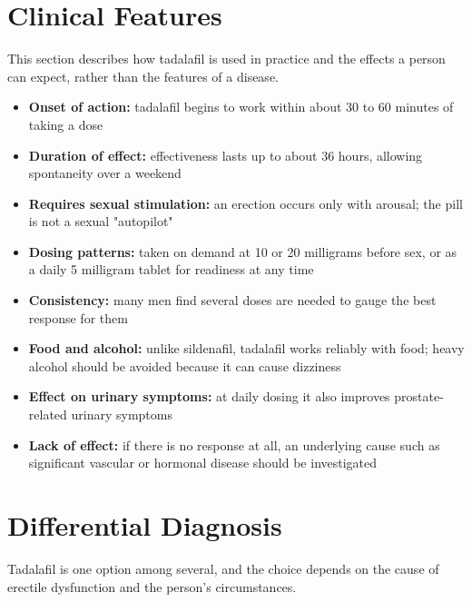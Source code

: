 \section*{Clinical Features}
This section describes how tadalafil is used in practice and the effects a person can expect, rather than the features of a disease.

\begin{itemize}
    \item \textbf{Onset of action:} tadalafil begins to work within about 30 to 60 minutes of taking a dose
    \item \textbf{Duration of effect:} effectiveness lasts up to about 36 hours, allowing spontaneity over a weekend
    \item \textbf{Requires sexual stimulation:} an erection occurs only with arousal; the pill is not a sexual "autopilot"
    \item \textbf{Dosing patterns:} taken on demand at 10 or 20 milligrams before sex, or as a daily 5 milligram tablet for readiness at any time
    \item \textbf{Consistency:} many men find several doses are needed to gauge the best response for them
    \item \textbf{Food and alcohol:} unlike sildenafil, tadalafil works reliably with food; heavy alcohol should be avoided because it can cause dizziness
    \item \textbf{Effect on urinary symptoms:} at daily dosing it also improves prostate-related urinary symptoms
    \item \textbf{Lack of effect:} if there is no response at all, an underlying cause such as significant vascular or hormonal disease should be investigated
\end{itemize}

\section*{Differential Diagnosis}
Tadalafil is one option among several, and the choice depends on the cause of erectile dysfunction and the person's circumstances.

